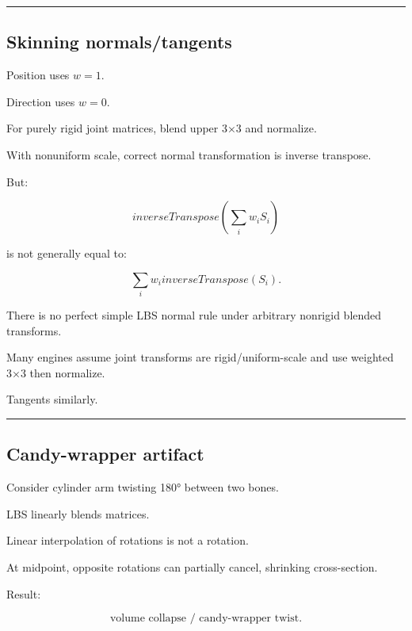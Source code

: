 \begin{center}\rule{0.5\linewidth}{0.5pt}\end{center}

\subsection{Skinning normals/tangents}\label{04-visual-computing-ii-ch041-skinning-normalstangents}

\hypertarget{04-visual-computing-ii-ch041-skinning-normalstangents}{}

Position uses \(w=1\).

Direction uses \(w=0\).

For purely rigid joint matrices, blend upper 3×3 and normalize.

With nonuniform scale, correct normal transformation is inverse transpose.

But:

\[
inverseTranspose
\left(
\sum_iw_iS_i
\right)
\]

is not generally equal to:

\[
\sum_iw_i
inverseTranspose(S_i).
\]

There is no perfect simple LBS normal rule under arbitrary nonrigid blended transforms.

Many engines assume joint transforms are rigid/uniform-scale and use weighted 3×3 then normalize.

Tangents similarly.

\begin{center}\rule{0.5\linewidth}{0.5pt}\end{center}

\subsection{Candy-wrapper artifact}\label{04-visual-computing-ii-ch041-candy-wrapper-artifact}

\hypertarget{04-visual-computing-ii-ch041-candy-wrapper-artifact}{}

Consider cylinder arm twisting 180° between two bones.

LBS linearly blends matrices.

Linear interpolation of rotations is not a rotation.

At midpoint, opposite rotations can partially cancel, shrinking cross-section.

Result:

\[
\boxed{
\text{volume collapse / candy-wrapper twist}.
}
\]

